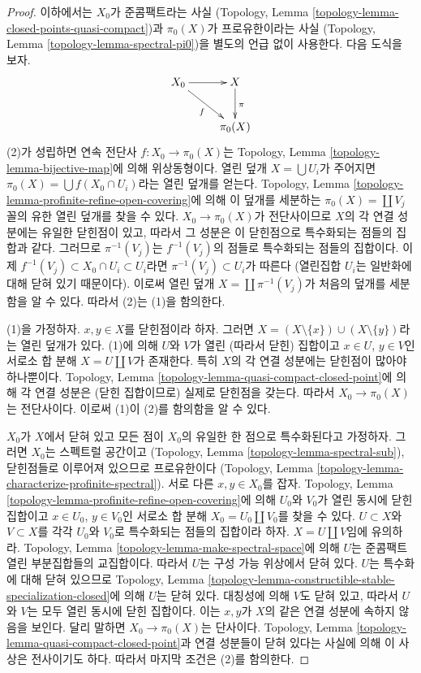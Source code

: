 \begin{proof}
이하에서는 $X_0$가 준콤팩트라는 사실
(Topology, Lemma \ref{topology-lemma-closed-points-quasi-compact})과
$\pi_0(X)$가 프로유한이라는 사실
(Topology, Lemma \ref{topology-lemma-spectral-pi0})을 별도의 언급 없이 사용한다.
다음 도식을 보자.
$$
\xymatrix{
X_0 \ar[rd]_f \ar[r] & X \ar[d]^\pi \\
& \pi_0(X)
}
$$
(2)가 성립하면 연속 전단사 $f : X_0 \to \pi_0(X)$는
Topology, Lemma \ref{topology-lemma-bijective-map}에 의해 위상동형이다.
열린 덮개 $X = \bigcup U_i$가 주어지면
$\pi_0(X) = \bigcup f(X_0 \cap U_i)$라는 열린 덮개를 얻는다.
Topology, Lemma \ref{topology-lemma-profinite-refine-open-covering}에 의해
이 덮개를 세분하는 $\pi_0(X) = \coprod V_j$ 꼴의 유한 열린 덮개를
찾을 수 있다.
$X_0 \to \pi_0(X)$가 전단사이므로 $X$의 각 연결 성분에는
유일한 닫힌점이 있고, 따라서 그 성분은 이 닫힌점으로 특수화되는
점들의 집합과 같다. 그러므로 $\pi^{-1}(V_j)$는
$f^{-1}(V_j)$의 점들로 특수화되는 점들의 집합이다.
이제 $f^{-1}(V_j) \subset X_0 \cap U_i \subset U_i$라면
$\pi^{-1}(V_j) \subset U_i$가 따른다
(열린집합 $U_i$는 일반화에 대해 닫혀 있기 때문이다).
이로써 열린 덮개 $X = \coprod \pi^{-1}(V_j)$가 처음의 덮개를
세분함을 알 수 있다. 따라서 (2)는 (1)을 함의한다.

\medskip\noindent
(1)을 가정하자. $x, y \in X$를 닫힌점이라 하자. 그러면
$X = (X \setminus \{x\}) \cup (X \setminus \{y\})$라는 열린 덮개가 있다.
(1)에 의해 $U$와 $V$가 열린 (따라서 닫힌) 집합이고
$x \in U$, $y \in V$인 서로소 합 분해 $X = U \amalg V$가 존재한다.
특히 $X$의 각 연결 성분에는 닫힌점이 많아야 하나뿐이다.
Topology, Lemma \ref{topology-lemma-quasi-compact-closed-point}에 의해
각 연결 성분은 (닫힌 집합이므로) 실제로 닫힌점을 갖는다.
따라서 $X_0 \to \pi_0(X)$는 전단사이다. 이로써 (1)이 (2)를 함의함을 알 수 있다.

\medskip\noindent
$X_0$가 $X$에서 닫혀 있고 모든 점이 $X_0$의 유일한 한 점으로
특수화된다고 가정하자. 그러면 $X_0$는 스펙트럴 공간이고
(Topology, Lemma \ref{topology-lemma-spectral-sub}),
닫힌점들로 이루어져 있으므로 프로유한이다
(Topology, Lemma \ref{topology-lemma-characterize-profinite-spectral}).
서로 다른 $x, y \in X_0$를 잡자.
Topology, Lemma \ref{topology-lemma-profinite-refine-open-covering}에 의해
$U_0$와 $V_0$가 열린 동시에 닫힌 집합이고
$x \in U_0$, $y \in V_0$인 서로소 합 분해
$X_0 = U_0 \amalg V_0$를 찾을 수 있다.
$U \subset X$와 $V \subset X$를 각각 $U_0$와 $V_0$로 특수화되는
점들의 집합이라 하자. $X = U \amalg V$임에 유의하라.
Topology, Lemma \ref{topology-lemma-make-spectral-space}에 의해
$U$는 준콤팩트 열린 부분집합들의 교집합이다.
따라서 $U$는 구성 가능 위상에서 닫혀 있다.
$U$는 특수화에 대해 닫혀 있으므로 Topology, Lemma
\ref{topology-lemma-constructible-stable-specialization-closed}에 의해
$U$는 닫혀 있다. 대칭성에 의해 $V$도 닫혀 있고, 따라서 $U$와 $V$는
모두 열린 동시에 닫힌 집합이다.
이는 $x, y$가 $X$의 같은 연결 성분에 속하지 않음을 보인다.
달리 말하면 $X_0 \to \pi_0(X)$는 단사이다.
Topology, Lemma \ref{topology-lemma-quasi-compact-closed-point}과
연결 성분들이 닫혀 있다는 사실에 의해 이 사상은 전사이기도 하다.
따라서 마지막 조건은 (2)를 함의한다.
\end{proof}

